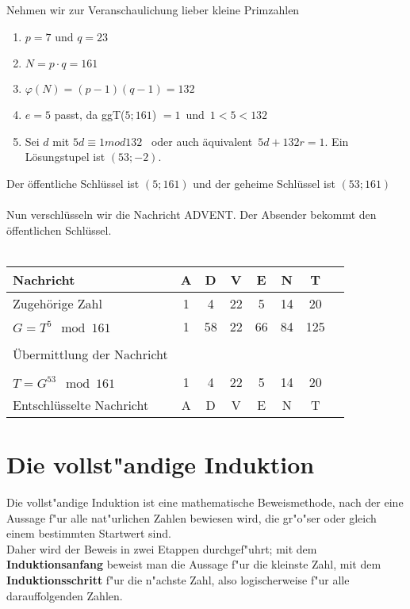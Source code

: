 \documentclass[../MAIN/main.tex]{subfiles}
\begin{document}
\begin{Beispiel}
Nehmen wir zur Veranschaulichung lieber kleine Primzahlen
\begin{enumerate}
\item $p = 7$ und $q = 23$\\
\item $N = p \cdot q = 161$\\
\item $\varphi(N) = (p-1)(q-1) = 132$\\
\item $e = 5$ passt, da ggT($5; 161$) $ = 1$ \,und\, $1<5<132$\\
\item Sei $d$ mit $5d \equiv 1 mod 132$ \, oder auch äquivalent \,$5d + 132r = 1$. Ein Lösungstupel ist $(53;-2)$. \\
\end{enumerate}
Der öffentliche Schlüssel ist $(5;161)$ und der geheime Schlüssel ist $(53;161)$\\\\
Nun verschlüsseln wir die Nachricht \glqq ADVENT\grqq. Der Absender bekommt den öffentlichen Schlüssel.\\\\

\begin{tabular}{l*{6}{c}r}
Nachricht              & A & D & V & E & N  & T  \\
\hline
Zugehörige Zahl & 1 & 4 & 22 & 5 & 14 & 20  \\
$G = T^5 \mod 161$            & 1 & 58 & 22 & 66 &  84 & 125  \\\\
Übermittlung der Nachricht &&&&&& \\\\
$T = G^{53} \mod 161$         &  1 & 4 & 22 & 5 & 14 & 20  \\
Entschlüsselte Nachricht              & A & D & V & E & N  & T  \\
\end{tabular}
\end{Beispiel}








	\section{Die vollst"andige Induktion}

Die vollst"andige Induktion ist eine mathematische Beweismethode, nach der eine Aussage f"ur alle nat"urlichen Zahlen bewiesen wird, die gr"o"ser oder gleich einem bestimmten Startwert sind.\\
Daher wird der Beweis in zwei Etappen durchgef"uhrt; mit dem \textbf{Induktionsanfang} beweist man die Aussage f"ur die kleinste Zahl, mit dem \textbf{Induktionsschritt} f"ur die n"achste Zahl, also logischerweise f"ur alle darauffolgenden Zahlen.\\\\
\end{document}
